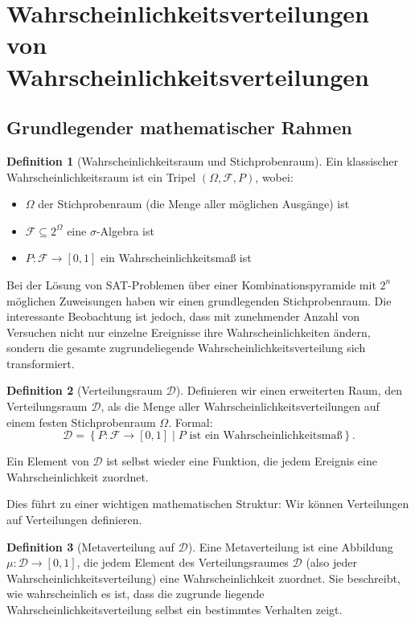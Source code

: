 ﻿\documentclass[a4paper,12pt]{article}
\theoremstyle{definition}
\newtheorem{definition}{Definition}
\begin{document}
\section{Wahrscheinlichkeitsverteilungen \\
von Wahrscheinlichkeitsverteilungen}

\subsection{Grundlegender mathematischer Rahmen}

\begin{definition}[Wahrscheinlichkeitsraum und Stichprobenraum]
Ein klassischer Wahrscheinlichkeitsraum ist ein Tripel $(\Omega, \mathcal{F}, P)$, wobei:
\begin{itemize}
	\item $\Omega$ der Stichprobenraum (die Menge aller möglichen Ausgänge) ist
	\item $\mathcal{F} \subseteq 2^\Omega$ eine $\sigma$-Algebra ist
	\item $P: \mathcal{F} \to [0,1]$ ein Wahrscheinlichkeitsmaß ist
\end{itemize}
\end{definition}

Bei der Lösung von SAT-Problemen über einer Kombinationspyramide mit $2^n$ möglichen Zuweisungen haben wir einen grundlegenden Stichprobenraum. Die interessante Beobachtung ist jedoch, dass mit zunehmender Anzahl von Versuchen nicht nur einzelne Ereignisse ihre Wahrscheinlichkeiten ändern, sondern die gesamte zugrundeliegende Wahrscheinlichkeitsverteilung sich transformiert.

\begin{definition}[Verteilungsraum $\mathcal{D}$]
Definieren wir einen erweiterten Raum, den Verteilungsraum $\mathcal{D}$, als die Menge aller Wahrscheinlichkeitsverteilungen auf einem festen Stichprobenraum $\Omega$. Formal:
\[
\mathcal{D} = \left\{ P: \mathcal{F} \to [0,1] \mid P \text{ ist ein Wahrscheinlichkeitsmaß} \right\}.
\]

Ein Element von $\mathcal{D}$ ist selbst wieder eine Funktion, die jedem Ereignis eine Wahrscheinlichkeit zuordnet.
\end{definition}

Dies führt zu einer wichtigen mathematischen Struktur: Wir können Verteilungen auf Verteilungen definieren.

\begin{definition}[Metaverteilung auf $\mathcal{D}$]
Eine Metaverteilung ist eine Abbildung $\mu: \mathcal{D} \to [0,1]$, die jedem Element des Verteilungsraumes $\mathcal{D}$ (also jeder Wahrscheinlichkeitsverteilung) eine Wahrscheinlichkeit zuordnet. Sie beschreibt, wie wahrscheinlich es ist, dass die zugrunde liegende Wahrscheinlichkeitsverteilung selbst ein bestimmtes Verhalten zeigt.
\end{definition}
\end{document}
